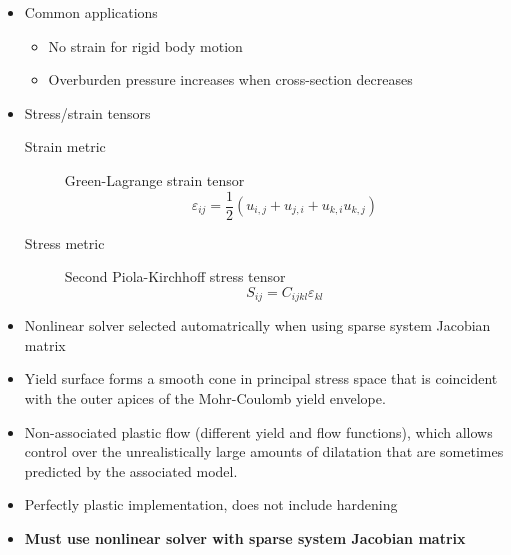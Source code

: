\documentclass[pdftex,cig,slideColor]{pp4slides}
\begin{document}
%
 


  \begin{itemize}
  \item Common applications
    \begin{itemize}
    \item No strain for rigid body motion
    \item Overburden pressure increases when cross-section decreases
    \end{itemize}
  \item Stress/strain tensors
    \begin{description}
    \item[Strain metric] Green-Lagrange strain tensor
      \vspace*{-14pt}
      \begin{equation}
        \varepsilon_{ij} = \frac{1}{2}(u_{i,j} + u_{j,i} + u_{k,i}u_{k,j})
      \end{equation}
    \item[Stress metric] Second Piola-Kirchhoff stress tensor
      \vspace*{-14pt}
      \begin{equation}
        S_{ij} = C_{ijkl} \varepsilon_{kl}
      \end{equation}
    \end{description}
  \item Nonlinear solver selected automatrically when using sparse
    system Jacobian matrix
  \end{itemize}


  \begin{itemize}
  \item Yield surface forms a smooth cone in principal stress space
    that is coincident with the outer apices of the Mohr-Coulomb yield
    envelope.
  \item Non-associated plastic flow (different yield and flow
    functions), which allows control over the unrealistically large
    amounts of dilatation that are sometimes predicted by the
    associated model.
  \item Perfectly plastic implementation, does not include hardening
 \item {\bf Must use nonlinear solver with sparse system Jacobian matrix}
  \end{itemize}
  
\end{document}
